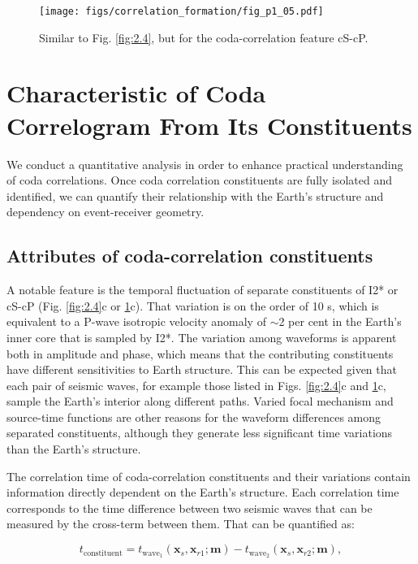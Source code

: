 \begin{figure}[!hbt]
	\centering
	\texttt{[image: figs/correlation\_formation/fig\_p1\_05.pdf]}
	\caption[Separation of the cS-cP constituents]
    {
		Similar to Fig. \ref{fig:2.4}, but for the coda-correlation feature cS-cP.
	}
	\label{fig:2.5}
\end{figure}


\section{Characteristic of Coda Correlogram From Its Constituents}\label{sec:theo_charc}

We conduct a quantitative analysis in order to enhance practical understanding of coda correlations. Once coda correlation constituents are fully isolated and identified, we can quantify their relationship with the Earth's structure and dependency on event-receiver geometry.

\subsection{Attributes of coda-correlation constituents}\label{subsec:theo_charc_attr}

A notable feature is the temporal fluctuation of separate constituents of I2* or cS-cP (Fig. \ref{fig:2.4}c or \ref{fig:2.5}c). That variation is on the order of 10 s, which is equivalent to a P-wave isotropic velocity anomaly of $\sim$2 per cent in the Earth's inner core that is sampled by I2*. The variation among waveforms is apparent both in amplitude and phase, which means that the contributing constituents have different sensitivities to Earth structure. This can be expected given that each pair of seismic waves, for example those listed in Figs. \ref{fig:2.4}c and \ref{fig:2.5}c, sample the Earth's interior along different paths. Varied focal mechanism and source-time functions are other reasons for the waveform differences among separated constituents, although they generate less significant time variations than the Earth's structure.




The correlation time of coda-correlation constituents and their variations contain information directly dependent on the Earth's structure. Each correlation time corresponds to the time difference between two seismic waves that can be measured by the cross-term between them. That can be quantified as:


\begin{equation}\label{eq:2.3}
    t_{\text{constituent}} = t_{\text{wave}_1}(\boldsymbol{x}_s, \boldsymbol{x}_{r1}; \boldsymbol{m})- t_{\text{wave}_2}(\boldsymbol{x}_s, \boldsymbol{x}_{r2}; \boldsymbol{m}),
\end{equation}

